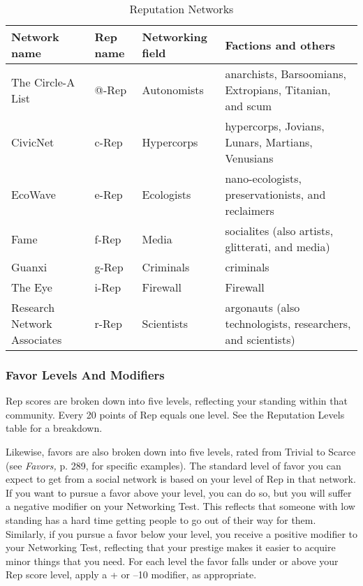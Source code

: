 \begin{table} \caption{Reputation Networks} \begin{tabularx}{\textwidth}{|X|l|l|X|} \hline



Network name &Rep name &Networking field &Factions and others \\ \hline

The Circle-A List &@-Rep &Autonomists &anarchists, Barsoomians, Extropians, Titanian, and scum \\ \hline

CivicNet &c-Rep &Hypercorps &hypercorps, Jovians, Lunars, Martians, Venusians \\ \hline

EcoWave &e-Rep &Ecologists &nano-ecologists, preservationists, and reclaimers \\ \hline

Fame &f-Rep &Media &socialites (also artists, glitterati, and media) \\ \hline

Guanxi &g-Rep &Criminals &criminals \\ \hline

The Eye &i-Rep &Firewall &Firewall \\ \hline

Research Network Associates &r-Rep &Scientists &argonauts (also technologists, researchers, and scientists) \\ \hline

\end{tabularx} \end{table} 

\subsubsection{Favor Levels And Modifiers} 

Rep scores are broken down into five levels, reflecting your standing within that community. Every 20 points of Rep equals one level. See the Reputation Levels table for a breakdown. 

Likewise, favors are also broken down into five levels, rated from Trivial to Scarce (see \textit{Favors,} p. 289, for specific examples). The standard level of favor you can expect to get from a social network is based on your level of Rep in that network. If you want to pursue a favor above your level, you can do so, but you will suffer a negative modifier on your Networking Test. This reflects that someone with low standing has a hard time getting people to go out of their way for them. Similarly, if you pursue a favor below your level, you receive a positive modifier to your Networking Test, reflecting that your prestige makes it easier to acquire minor things that you need. For each level the favor falls under or above your Rep score level, apply a + or –10 modifier, as appropriate. 

